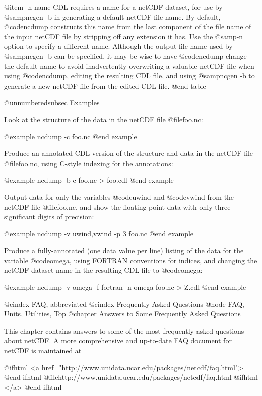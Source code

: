 {@item -n name
CDL requires a name for a netCDF dataset, for use by @samp{ncgen -b} in
generating a default netCDF file name.  By default, @code{ncdump}
constructs this name from the last component of the file name of the
input netCDF file by stripping off any extension it has.  Use the
@samp{-n} option to specify a different name.  Although the output file
name used by @samp{ncgen -b} can be specified, it may be wise to have
@code{ncdump} change the default name to avoid inadvertently overwriting
a valuable netCDF file when using @code{ncdump}, editing the resulting
CDL file, and using @samp{ncgen -b} to generate a new netCDF file from
the edited CDL file.
@end table

@unnumberedsubsec Examples

Look at the structure of the data in the netCDF file @file{foo.nc}:

@example
ncdump -c foo.nc
@end example

Produce an annotated CDL version of the structure and data in the
netCDF file @file{foo.nc}, using C-style indexing for the annotations:

@example
ncdump -b c foo.nc > foo.cdl
@end example

Output data for only the variables @code{uwind} and @code{vwind} from
the netCDF file @file{foo.nc}, and show the floating-point data with
only three significant digits of precision:

@example
ncdump -v uwind,vwind -p 3 foo.nc
@end example

Produce a fully-annotated (one data value per line) listing of the data
for the variable @code{omega}, using FORTRAN conventions for indices,
and changing the netCDF dataset name in the resulting CDL file to
@code{omega}:

@example
ncdump -v omega -f fortran -n omega foo.nc > Z.cdl
@end example

@cindex FAQ, abbreviated
@cindex Frequently Asked Questions
@node FAQ, Units, Utilities, Top
@chapter Answers to Some Frequently Asked Questions

This chapter contains answers to some of the most frequently
asked questions about netCDF.  A more
comprehensive and up-to-date FAQ document for netCDF is maintained at

@ifhtml
<a href="http://www.unidata.ucar.edu/packages/netcdf/faq.html">
@end ifhtml
@file{http://www.unidata.ucar.edu/packages/netcdf/faq.html}
@ifhtml
</a>
@end ifhtml



}
